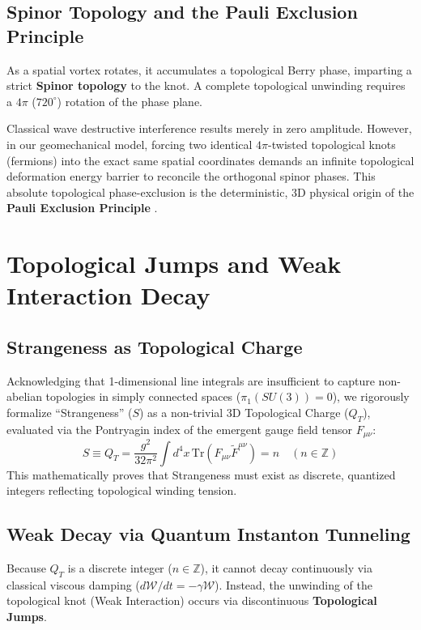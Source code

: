\documentclass[reprint,amsmath,amssymb,aps,prd]{revtex4-2}
\begin{document}
\subsection{Spinor Topology and the Pauli Exclusion Principle}
As a spatial vortex rotates, it accumulates a topological Berry phase, imparting a strict \textbf{Spinor topology} to the knot. A complete topological unwinding requires a $4\pi$ ($720^\circ$) rotation of the phase plane. 

Classical wave destructive interference results merely in zero amplitude. However, in our geomechanical model, forcing two identical $4\pi$-twisted topological knots (fermions) into the exact same spatial coordinates demands an infinite topological deformation energy barrier to reconcile the orthogonal spinor phases. This absolute topological phase-exclusion is the deterministic, 3D physical origin of the \textbf{Pauli Exclusion Principle} \cite{Pauli1925}.

\section{Topological Jumps and Weak Interaction Decay}

\subsection{Strangeness as Topological Charge}
Acknowledging that 1-dimensional line integrals are insufficient to capture non-abelian topologies in simply connected spaces ($\pi_1(SU(3)) = 0$), we rigorously formalize ``Strangeness'' ($S$) as a non-trivial 3D Topological Charge ($Q_T$), evaluated via the Pontryagin index of the emergent gauge field tensor $F_{\mu\nu}$:
\begin{equation}
S \equiv Q_T = \frac{g^2}{32\pi^2} \int d^4x \, \mathrm{Tr}(F_{\mu\nu} \tilde{F}^{\mu\nu}) = n \quad (n \in \mathbb{Z})
\end{equation}
This mathematically proves that Strangeness must exist as discrete, quantized integers reflecting topological winding tension.

\subsection{Weak Decay via Quantum Instanton Tunneling}
Because $Q_T$ is a discrete integer ($n \in \mathbb{Z}$), it cannot decay continuously via classical viscous damping ($d\mathcal{W}/dt = -\gamma \mathcal{W}$). Instead, the unwinding of the topological knot (Weak Interaction) occurs via discontinuous \textbf{Topological Jumps}.
\end{document}
